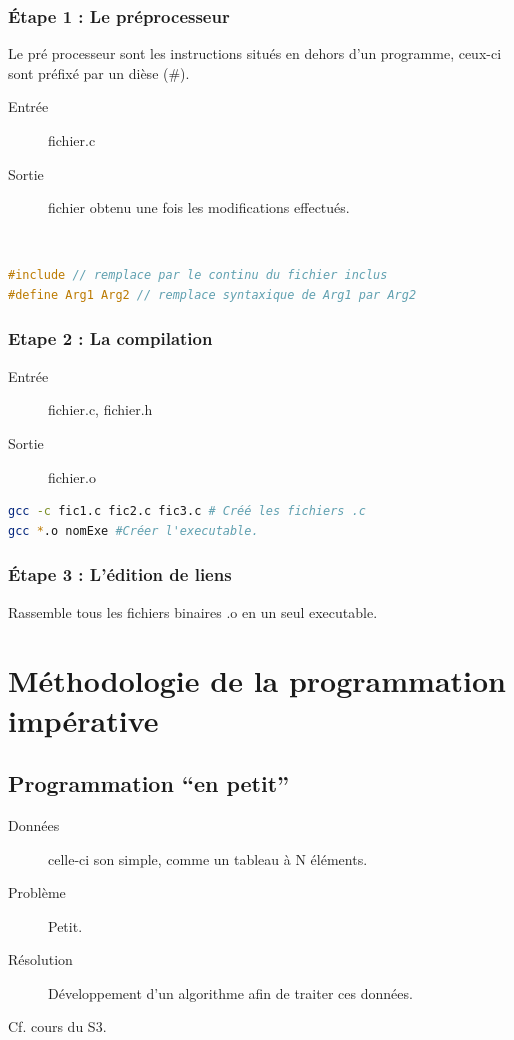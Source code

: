\documentclass[12pt,a4paper,openany]{book}
\begin{document}
\subsection{\'Etape 1 : Le préprocesseur}
Le pré processeur sont les instructions situés en dehors d'un programme, ceux-ci sont préfixé par un dièse (\#).
\begin{description}
	\item[Entrée] fichier.c
	\item[Sortie] fichier obtenu une fois les modifications effectués.
\end{description}~
\begin{lstlisting}[language=C, caption=Exemple d'instructions pré-processeurs]
#include // remplace par le continu du fichier inclus
#define Arg1 Arg2 // remplace syntaxique de Arg1 par Arg2
\end{lstlisting}
\subsection{Etape 2 : La compilation}
\begin{description}
	\item[Entrée] fichier.c, fichier.h
	\item[Sortie] fichier.o 
\end{description}
\begin{lstlisting}[language=bash]
gcc -c fic1.c fic2.c fic3.c # Créé les fichiers .c
gcc *.o nomExe #Créer l'executable.
\end{lstlisting}
\subsection{\'Etape 3 : L'édition de liens}
Rassemble tous les fichiers binaires .o en un seul executable.
	\chapter{Méthodologie de la programmation impérative}
		\section{Programmation ``en petit''}
		\begin{description}
			\item[Données] celle-ci son simple, comme un tableau à N éléments.
			\item[Problème] Petit.
			\item[Résolution] Développement d'un algorithme afin de traiter ces données.
		\end{description}
		Cf. cours du S3.
\end{document}

